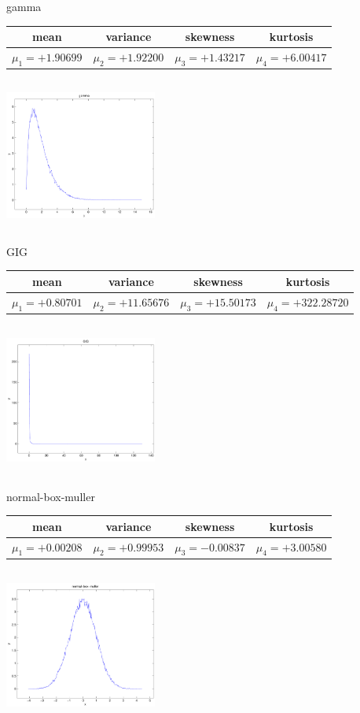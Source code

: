\documentclass[9pt]{article}
\theoremstyle{plain}
\theoremstyle{definition}
\theoremstyle{remark}
\numberwithin{equation}{section}
\begin{document}
\newpage
gamma \begin{tabular}{|c|c|c|c|}  mean & variance & skewness & kurtosis \\  \hline
$\mu_1 = +1.90699$ & $\mu_2 = +1.92200$ & $\mu_3 = +1.43217$ & $\mu_4 =+6.00417$ \\
\end{tabular}

\includegraphics[width=5cm,height=5cm]{gamma.pdf}

GIG \begin{tabular}{|c|c|c|c|}  mean & variance & skewness & kurtosis \\  \hline
$\mu_1 = +0.80701$ & $\mu_2 = +11.65676$ & $\mu_3 = +15.50173$ & $\mu_4 =+322.28720$ \\
\end{tabular}

\includegraphics[width=5cm,height=5cm]{GIG.pdf}

normal-box-muller \begin{tabular}{|c|c|c|c|}  mean & variance & skewness & kurtosis \\  \hline
$\mu_1 = +0.00208$ & $\mu_2 = +0.99953$ & $\mu_3 = -0.00837$ & $\mu_4 =+3.00580$ \\
\end{tabular}

\includegraphics[width=5cm,height=5cm]{normal-box-muller.pdf}
\end{document}
